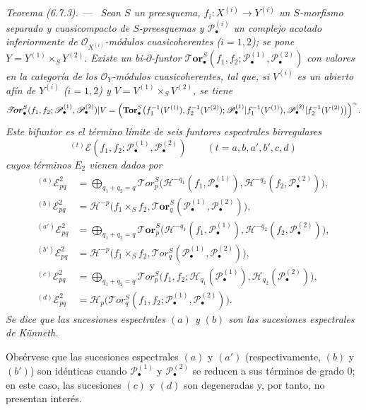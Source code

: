 \documentclass[10pt,oneside]{book}
\newcommand{\oldpage}[2][]{\setcounter{footnote}{0}\marginpar{\scriptsize\textbf{#1}~|~#2}\ignorespaces}
\newenvironment{theorem}[1][]{\par\medskip\noindent\itshape Teorema (#1). ---\ }{\par}
\begin{document}
\begin{theorem}[6.7.3]
\label{III.6.7.3}
Sean $S$ un preesquema, $f_i:X^{(i)}\to Y^{(i)}$ un $S$-morfismo separado y
cuasicompacto de $S$-preesquemas y $\mathscr P_\bullet^{(i)}$ un complejo
acotado inferiormente de $\mathscr O_{X^{(i)}}$-módulos cuasicoherentes
($i=1,2$); se pone $Y=Y^{(1)}\times_S Y^{(2)}$. Existe un
bi-$\partial$-funtor
  $\boldsymbol{\mathscr T\!or}_\bullet^S
(f_1,f_2;\mathscr P_\bullet^{(1)},\mathscr P_\bullet^{(2)})$
con valores en la categoría de los $\mathscr O_Y$-módulos cuasicoherentes,
tal que, si $V^{(i)}$ es un abierto afín de $Y^{(i)}$ ($i=1,2$) y
$V=V^{(1)}\times_S V^{(2)}$, se tiene
\[
  \boldsymbol{\mathscr T\!or}_\bullet^S
  (f_1,f_2;\mathscr P_\bullet^{(1)},\mathscr P_\bullet^{(2)})|V
  =\Bigl(\mathbf{Tor}_\bullet^S
    \bigl(f_1^{-1}(V^{(1)}),f_2^{-1}(V^{(2)});
      \mathscr P_\bullet^{(1)}|f_1^{-1}(V^{(1)}),
      \mathscr P_\bullet^{(2)}|f_2^{-1}(V^{(2)})\bigr)\Bigr)^{\sim}.
\]
\oldpage[III]{159}
Este bifuntor es el término límite de seis funtores espectrales
birregulares
\[
  {}^{(t)}\mathscr E
  (f_1,f_2;\mathscr P_\bullet^{(1)},\mathscr P_\bullet^{(2)})
  \qquad(t=a,b,a',b',c,d)
\]
cuyos términos $E_2$ vienen dados por
\[
\begin{aligned}
  {}^{(a)}\mathscr E_{pq}^2
  &=\bigoplus_{q_1+q_2=q}
    \mathscr{T}\!or_p^S
    \bigl(\mathcal H^{-q_1}(f_1,\mathscr P_\bullet^{(1)}),
          \mathcal H^{-q_2}(f_2,\mathscr P_\bullet^{(2)})\bigr),\\
  {}^{(b)}\mathscr E_{pq}^2
  &=\mathscr H^{-p}\bigl(f_1\times_S f_2,
    \boldsymbol{\mathscr T\!or}_q^S
    (\mathscr P_\bullet^{(1)},\mathscr P_\bullet^{(2)})\bigr),\\
  {}^{(a')}\mathscr E_{pq}^2
  &=\bigoplus_{q_1+q_2=q}
    \boldsymbol{\mathscr T\!or}_p^S
    \bigl(\mathscr H^{-q_1}(f_1,\mathscr P_\bullet^{(1)}),
          \mathscr H^{-q_2}(f_2,\mathscr P_\bullet^{(2)})\bigr),\\
  {}^{(b')}\mathscr E_{pq}^2
  &=\mathcal H^{-p}\bigl(f_1\times_S f_2,
    \mathscr{T}\!or_q^S
    (\mathscr P_\bullet^{(1)},\mathscr P_\bullet^{(2)})\bigr),\\
  {}^{(c)}\mathscr E_{pq}^2
  &=\bigoplus_{q_1+q_2=q}
    \mathscr T\!or_p^S
    \bigl(f_1,f_2;
      \mathscr H_{q_1}(\mathscr P_\bullet^{(1)}),
      \mathscr H_{q_2}(\mathscr P_\bullet^{(2)})\bigr),\\
  {}^{(d)}\mathscr E_{pq}^2
  &=\mathscr H_p\bigl(\mathscr T\!or_q^S
    (f_1,f_2;\mathscr P_\bullet^{(1)},\mathscr P_\bullet^{(2)})\bigr).
\end{aligned}
\]
Se dice que las sucesiones espectrales $(a)$ y $(b)$ son las
\emph{sucesiones espectrales de Künneth}.

Obsérvese que las sucesiones espectrales $(a)$ y $(a')$ (respectivamente,
$(b)$ y $(b')$) son idénticas cuando $\mathscr P_\bullet^{(1)}$ y
$\mathscr P_\bullet^{(2)}$ se reducen a sus términos de grado 0; en este caso,
las sucesiones $(c)$ y $(d)$ son degeneradas y, por tanto, no presentan
interés.
\end{theorem}
\end{document}
